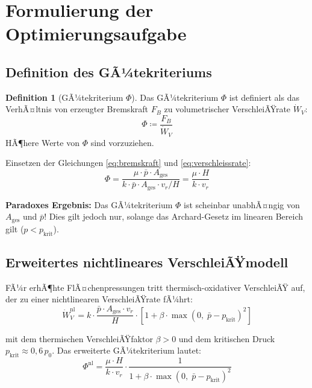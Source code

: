 ﻿\documentclass[12pt,a4paper]{article}
\theoremstyle{definition}
\newtheorem{definition}{Definition}[section]
\begin{document}
\section{Formulierung der Optimierungsaufgabe}

\subsection{Definition des GÃ¼tekriteriums}

\begin{definition}[GÃ¼tekriterium $\Phi$]
  Das GÃ¼tekriterium $\Phi$ ist definiert als das VerhÃ¤ltnis von
  erzeugter Bremskraft $F_B$ zu volumetrischer VerschleiÃŸrate
  $\dot{W}_V$:
  \begin{equation}
    \Phi \coloneqq \frac{F_B}{\dot{W}_V}
    \label{eq:phi_def}
  \end{equation}
  HÃ¶here Werte von $\Phi$ sind vorzuziehen.
\end{definition}

Einsetzen der Gleichungen \eqref{eq:bremskraft} und \eqref{eq:verschleissrate}:
\begin{equation}
  \Phi = \frac{\mu \cdot \bar{p} \cdot A_{\text{ges}}}
              {k \cdot \bar{p} \cdot A_{\text{ges}} \cdot v_r / H}
       = \frac{\mu \cdot H}{k \cdot v_r}
  \label{eq:phi_vereinfacht}
\end{equation}

\textbf{Paradoxes Ergebnis:} Das GÃ¼tekriterium $\Phi$ ist scheinbar
unabhÃ¤ngig von $A_{\text{ges}}$ und $\bar{p}$!  Dies gilt jedoch nur,
solange das Archard-Gesetz im linearen Bereich gilt ($p < p_{\text{krit}}$).

\subsection{Erweitertes nichtlineares VerschleiÃŸmodell}

FÃ¼r erhÃ¶hte FlÃ¤chenpressungen tritt thermisch-oxidativer VerschleiÃŸ auf,
der zu einer nichtlinearen VerschleiÃŸrate fÃ¼hrt:
\begin{equation}
  \dot{W}_V^{\text{nl}} = k \cdot \frac{\bar{p} \cdot A_{\text{ges}} \cdot v_r}{H}
  \cdot \left[1 + \beta \cdot \max\!\left(0,\;\bar{p} - p_{\text{krit}}\right)^2\right]
  \label{eq:archard_nl}
\end{equation}

mit dem thermischen VerschleiÃŸfaktor $\beta > 0$ und dem kritischen Druck
$p_{\text{krit}} \approx 0{,}6\,p_0$.  Das erweiterte GÃ¼tekriterium lautet:
\begin{equation}
  \Phi^{\text{nl}} = \frac{\mu \cdot H}{k \cdot v_r}
  \cdot \frac{1}{1 + \beta \cdot \max\!\left(0,\;\bar{p} - p_{\text{krit}}\right)^2}
  \label{eq:phi_nl}
\end{equation}
\end{document}
